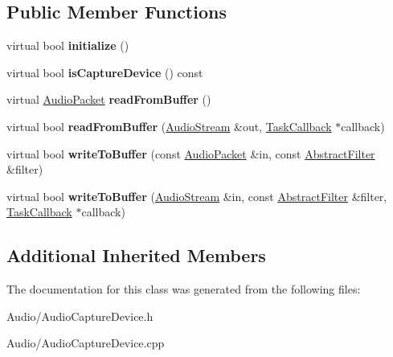 \subsection*{Public Member Functions}
\begin{DoxyCompactItemize}
\item 
\hypertarget{class_d_x_1_1_audio_1_1_audio_capture_device_a5ddf885c345d4ccf08b43dbc1c19784f}{virtual bool {\bfseries initialize} ()}\label{class_d_x_1_1_audio_1_1_audio_capture_device_a5ddf885c345d4ccf08b43dbc1c19784f}

\item 
\hypertarget{class_d_x_1_1_audio_1_1_audio_capture_device_acb57e48a6ca54178ee16ac27cfd7c483}{virtual bool {\bfseries is\-Capture\-Device} () const }\label{class_d_x_1_1_audio_1_1_audio_capture_device_acb57e48a6ca54178ee16ac27cfd7c483}

\item 
\hypertarget{class_d_x_1_1_audio_1_1_audio_capture_device_adf79121ec0570247120739a3d2df0af3}{virtual \hyperlink{class_d_x_1_1_audio_1_1_audio_packet}{Audio\-Packet} {\bfseries read\-From\-Buffer} ()}\label{class_d_x_1_1_audio_1_1_audio_capture_device_adf79121ec0570247120739a3d2df0af3}

\item 
\hypertarget{class_d_x_1_1_audio_1_1_audio_capture_device_a188bf18aae62acbdc9d205753529317c}{virtual bool {\bfseries read\-From\-Buffer} (\hyperlink{class_d_x_1_1_lock_free_1_1_concurrent_stream}{Audio\-Stream} \&out, \hyperlink{class_d_x_1_1_audio_1_1_task_callback}{Task\-Callback} $\ast$callback)}\label{class_d_x_1_1_audio_1_1_audio_capture_device_a188bf18aae62acbdc9d205753529317c}

\item 
\hypertarget{class_d_x_1_1_audio_1_1_audio_capture_device_ae3ef3d8ab13553e0a7e081960591273c}{virtual bool {\bfseries write\-To\-Buffer} (const \hyperlink{class_d_x_1_1_audio_1_1_audio_packet}{Audio\-Packet} \&in, const \hyperlink{struct_d_x_1_1_audio_1_1_abstract_filter}{Abstract\-Filter} \&filter)}\label{class_d_x_1_1_audio_1_1_audio_capture_device_ae3ef3d8ab13553e0a7e081960591273c}

\item 
\hypertarget{class_d_x_1_1_audio_1_1_audio_capture_device_af0a0c34af91c30d60dedf754c5ecd916}{virtual bool {\bfseries write\-To\-Buffer} (\hyperlink{class_d_x_1_1_lock_free_1_1_concurrent_stream}{Audio\-Stream} \&in, const \hyperlink{struct_d_x_1_1_audio_1_1_abstract_filter}{Abstract\-Filter} \&filter, \hyperlink{class_d_x_1_1_audio_1_1_task_callback}{Task\-Callback} $\ast$callback)}\label{class_d_x_1_1_audio_1_1_audio_capture_device_af0a0c34af91c30d60dedf754c5ecd916}

\end{DoxyCompactItemize}
\subsection*{Additional Inherited Members}


The documentation for this class was generated from the following files\-:\begin{DoxyCompactItemize}
\item 
Audio/Audio\-Capture\-Device.\-h\item 
Audio/Audio\-Capture\-Device.\-cpp\end{DoxyCompactItemize}
